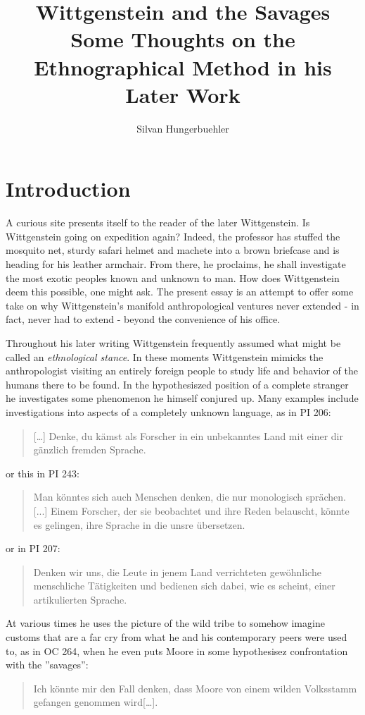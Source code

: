 \documentclass{article}
\title{Wittgenstein and the Savages\\
\large Some Thoughts on the Ethnographical Method in his Later Work}
\date{}
\author{Silvan Hungerbuehler}
\begin{document}
\maketitle
\section{Introduction}
A curious site presents itself to the reader of the later Wittgenstein. Is Wittgenstein going on expedition again? Indeed, the professor has stuffed the mosquito net, sturdy safari helmet and machete into a brown briefcase and is heading for his leather armchair. From there, he proclaims, he shall investigate the most exotic peoples known and unknown to man. How does Wittgenstein deem this possible, one might ask. The present essay is an attempt to offer some take on why Wittgenstein's manifold anthropological ventures never extended - in fact, never had to extend - beyond the convenience of his office. 

Throughout his later writing Wittgenstein frequently assumed what might be called an \textit{ethnological stance}. In these moments Wittgenstein mimicks the anthropologist visiting an entirely foreign people to study life and behavior of the humans there to be found. In the hypothesiszed position of a complete stranger
he investigates some phenomenon he himself conjured up. Many examples include investigations into aspects of a completely unknown language, as in PI 206:
\begin{quote}
[…] Denke, du kämst als Forscher in ein unbekanntes Land mit einer dir gänzlich fremden Sprache.
\end{quote}
or this in PI 243:
\begin{quote}
Man k{\"o}nntes sich auch Menschen denken, die nur monologisch spr{\"a}chen. [...] Einem Forscher, der sie beobachtet und ihre Reden belauscht, k{\"o}nnte es gelingen, ihre Sprache in die unsre {\"u}bersetzen.
\end{quote}
or in PI 207: 
\begin{quote}
Denken wir uns, die Leute in jenem Land verrichteten gewöhnliche menschliche Tätigkeiten und bedienen sich dabei, wie es scheint, einer artikulierten Sprache.
\end{quote}
 At various times he uses the picture of the wild tribe to somehow imagine customs that are a far cry from what he and his contemporary peers were used to, as in OC 264, when he even puts Moore in some hypothesisez confrontation with the ''savages'':
 \begin{quote}
Ich könnte mir den Fall denken, dass Moore von einem wilden Volksstamm gefangen genommen wird[…].
\end{quote}
\end{document}
